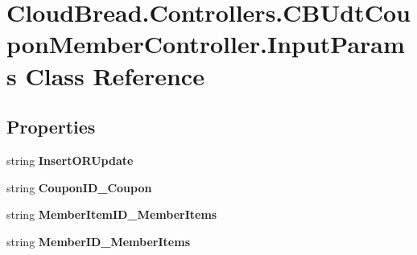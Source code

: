 \hypertarget{class_cloud_bread_1_1_controllers_1_1_c_b_udt_coupon_member_controller_1_1_input_params}{}\section{Cloud\+Bread.\+Controllers.\+C\+B\+Udt\+Coupon\+Member\+Controller.\+Input\+Params Class Reference}
\label{class_cloud_bread_1_1_controllers_1_1_c_b_udt_coupon_member_controller_1_1_input_params}
\subsection*{Properties}
\begin{DoxyCompactItemize}
\item 
string {\bfseries Insert\+O\+R\+Update}\hypertarget{class_cloud_bread_1_1_controllers_1_1_c_b_udt_coupon_member_controller_1_1_input_params_ab92e7de3e231521eb00380a88b9e65c8}{}\label{class_cloud_bread_1_1_controllers_1_1_c_b_udt_coupon_member_controller_1_1_input_params_ab92e7de3e231521eb00380a88b9e65c8}

\item 
string {\bfseries Coupon\+I\+D\+\_\+\+Coupon}\hypertarget{class_cloud_bread_1_1_controllers_1_1_c_b_udt_coupon_member_controller_1_1_input_params_a1f5d32da0b5b102c52136376f52bb3e9}{}\label{class_cloud_bread_1_1_controllers_1_1_c_b_udt_coupon_member_controller_1_1_input_params_a1f5d32da0b5b102c52136376f52bb3e9}

\item 
string {\bfseries Member\+Item\+I\+D\+\_\+\+Member\+Items}\hypertarget{class_cloud_bread_1_1_controllers_1_1_c_b_udt_coupon_member_controller_1_1_input_params_af9408f792a3c30ad1f916257ac6c7631}{}\label{class_cloud_bread_1_1_controllers_1_1_c_b_udt_coupon_member_controller_1_1_input_params_af9408f792a3c30ad1f916257ac6c7631}

\item 
string {\bfseries Member\+I\+D\+\_\+\+Member\+Items}\hypertarget{class_cloud_bread_1_1_controllers_1_1_c_b_udt_coupon_member_controller_1_1_input_params_aca0afeb9e6990b4ff07049422fbf62a6}{}\label{class_cloud_bread_1_1_controllers_1_1_c_b_udt_coupon_member_controller_1_1_input_params_aca0afeb9e6990b4ff07049422fbf62a6}


\end{DoxyCompactItemize}
